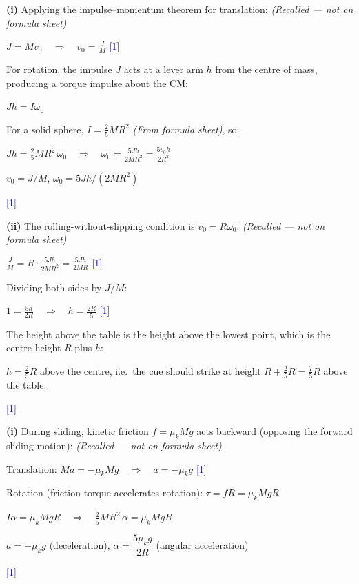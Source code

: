 \documentclass[12pt,a4paper]{article}
\newcommand{\markstep}[1]{\hfill\textcolor{blue}{[#1]}}
\newcommand{\finalanswer}[1]{%
  \begin{tcolorbox}[colback=green!5!white,colframe=green!50!black,boxrule=0.5pt]
  #1
  \end{tcolorbox}
}
\newcommand{\fromsheet}{\textit{(From formula sheet)}}
\newcommand{\recalled}{\textit{(Recalled --- not on formula sheet)}}
\begin{document}
\begin{parts}

\item

\textbf{(i)} Applying the impulse--momentum theorem for translation: \recalled

$J = Mv_0 \quad\Longrightarrow\quad v_0 = \frac{J}{M}$ \markstep{1}

For rotation, the impulse $J$ acts at a lever arm $h$ from the centre of mass, producing a torque impulse about the CM:

$Jh = I\omega_0$

For a solid sphere, $I = \frac{2}{5}MR^2$ \fromsheet, so:

$Jh = \frac{2}{5}MR^2\,\omega_0 \quad\Longrightarrow\quad \omega_0 = \frac{5Jh}{2MR^2} = \frac{5v_0 h}{2R^2}$

\finalanswer{$v_0 = J/M$, \quad $\omega_0 = 5Jh/(2MR^2)$} \markstep{1}

\textbf{(ii)} The rolling-without-slipping condition is $v_0 = R\omega_0$: \recalled

$\frac{J}{M} = R\cdot\frac{5Jh}{2MR^2} = \frac{5Jh}{2MR}$ \markstep{1}

Dividing both sides by $J/M$:

$1 = \frac{5h}{2R} \quad\Longrightarrow\quad h = \frac{2R}{5}$ \markstep{1}

The height above the table is the height above the lowest point, which is the centre height $R$ plus $h$:

\finalanswer{$h = \frac{2}{5}R$ above the centre, i.e.\ the cue should strike at height $R + \frac{2}{5}R = \frac{7}{5}R$ above the table.} \markstep{1}

\item

\textbf{(i)} During sliding, kinetic friction $f = \mu_k Mg$ acts backward (opposing the forward sliding motion): \recalled

Translation: $Ma = -\mu_k Mg \quad\Longrightarrow\quad a = -\mu_k g$ \markstep{1}

Rotation (friction torque accelerates rotation): $\tau = fR = \mu_k MgR$

$I\alpha = \mu_k MgR \quad\Longrightarrow\quad \frac{2}{5}MR^2\,\alpha = \mu_k MgR$

\finalanswer{$a = -\mu_k g$ (deceleration), \quad $\alpha = \dfrac{5\mu_k g}{2R}$ (angular acceleration)} \markstep{1}


\end{parts}
\end{document}

